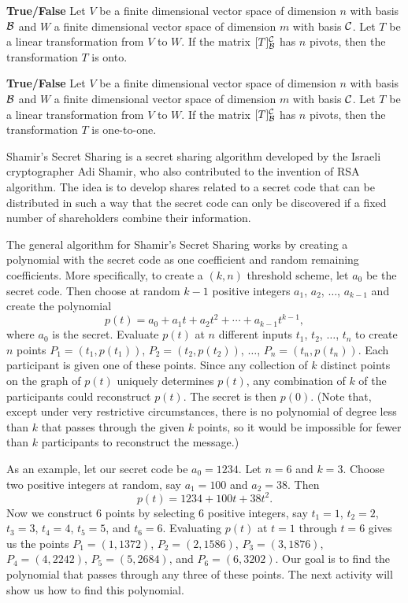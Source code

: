 \item \textbf{True/False}  Let $V$ be a finite dimensional vector space of dimension $n$ with basis $\mathcal{B}$ and $W$ a finite dimensional vector space of dimension $m$ with basis $\mathcal{C}$. Let $T$ be a linear transformation from $V$ to $W$. If the matrix $[T]_{\mathcal{B}}^{\mathcal{C}}$ has $n$ pivots, then the transformation $T$ is onto.

\item \textbf{True/False} Let $V$ be a finite dimensional vector space of dimension $n$ with basis $\mathcal{B}$ and $W$ a finite dimensional vector space of dimension $m$ with basis $\mathcal{C}$. Let $T$ be a linear transformation from $V$ to $W$. If the matrix $[T]_{\mathcal{B}}^{\mathcal{C}}$ has $n$ pivots, then the transformation $T$ is one-to-one.

	\ea


\ee

\label{sec:proj_secret}

Shamir's Secret Sharing is a secret sharing algorithm developed by the Israeli cryptographer Adi Shamir, who also contributed to the invention of RSA algorithm. The idea is to develop shares related to a secret code that can be distributed in such a way that the secret code can only be discovered if a fixed number of shareholders combine their information. 

The general algorithm for Shamir's Secret Sharing works by creating a polynomial with the secret code as one coefficient and random remaining coefficients. More specifically, to create a $(k,n)$ threshold scheme, let $a_0$ be the secret code. Then choose at random $k-1$ positive integers $a_1$, $a_2$, $\ldots$, $a_{k-1}$ and create the polynomial
\[p(t) = a_0 + a_1t + a_2 t^2 + \cdots + a_{k-1}t^{k-1},\]
where $a_0$ is the secret. Evaluate $p(t)$ at $n$ different inputs $t_1$, $t_2$, $\ldots$, $t_n$ to create $n$ points $P_1 = (t_1,p(t_1))$, $P_2 = (t_2,p(t_2))$, $\ldots$, $P_n = (t_n, p(t_n))$. Each participant is given one of these points. Since any collection of $k$ distinct points on the graph of $p(t)$ uniquely determines $p(t)$, any combination of $k$ of the participants could reconstruct $p(t)$. The secret is then $p(0)$. (Note that, except under very restrictive circumstances, there is no polynomial of degree less than $k$ that passes through the given $k$ points, so it would be impossible for fewer than $k$ participants to reconstruct the message.) 

As an example, let our secret code be $a_0=1234$. Let $n = 6$ and $k = 3$. Choose two positive integers at random, say $a_1 = 100$ and $a_2 = 38$. Then
\begin{equation} \label{eq:SSS_polynomial}
p(t) = 1234 + 100t + 38t^2.
\end{equation}
Now we construct $6$ points by selecting $6$ positive integers, say $t_1 = 1$, $t_2 = 2$, $t_3 = 3$, $t_4 = 4$, $t_5 = 5$, and $t_6 = 6$. Evaluating $p(t)$ at $t=1$ through $t=6$ gives us the points $P_1 = (1,1372)$, $P_2 = (2,1586)$, $P_3 = (3,1876)$, $P_4 = (4,2242)$, $P_5 = (5,2684)$, and $P_6 = (6,3202)$. Our goal is to find the polynomial that passes through any three of these points. The next activity will show us how to find this polynomial.

